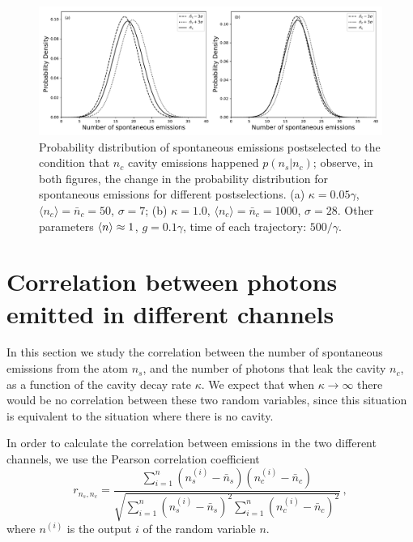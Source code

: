 \documentclass[%
 reprint,
 amsmath,amssymb,
 aps, 
]{revtex4-1}
\begin{document}
\begin{center}
\begin{figure}
\begin{center}
\includegraphics[scale = 0.5]{lastgraph1.pdf}
\caption{Probability distribution of spontaneous emissions
  postselected to the condition that $n_c$ cavity emissions happened
  $p(n_s|n_c)$; observe, in both figures, the change in the
  probability distribution for spontaneous emissions for different
  postselections. (a) $\kappa = 0.05\gamma$,
  $\langle n_c\rangle=\bar{n}_c=50$, $\sigma=7$; (b) 
  $\kappa = 1.0$, $\langle n_c\rangle=\bar{n}_c=1000$, $\sigma=28$.
  Other parameters $\expval{n} \approx 1$, $g =0.1\gamma$,
  time of each trajectory: $500/\gamma$. } \label{probdisult}
\end{center}
\end{figure}
\end{center}


\section{Correlation between photons emitted in different channels}\label{sc:correlation}
In this section we study the correlation between the number of
spontaneous emissions from the atom $n_s$, and the number of photons
that leak the cavity $n_c$, as a function of the cavity decay rate
$\kappa$. We expect that when $\kappa\rightarrow\infty$ there would be
no correlation between these two random variables, since this
situation is equivalent to the situation where there is no
cavity.

In order to calculate the correlation between emissions in the two
different channels, we use the Pearson correlation coefficient
\cite{benesty2009pearson}
\begin{equation} 
r_{n_s,n_c} = \frac{\sum\limits_{i=1}^n(n_s^{(i)} -
  \bar{n}_s)(n_c^{(i)} - \bar{n}_c)}{\sqrt{\sum\limits_{i=1}^n(n_s^{(i)}
    - \bar{n}_s)^2\sum\limits_{i=1}^n(n_c^{(i)} - \bar{n}_c)^2}}\, ,  \label{correlationc}
\end{equation}
where $n^{(i)}$ is the output $i$ of the random variable $n$.
\end{document}
